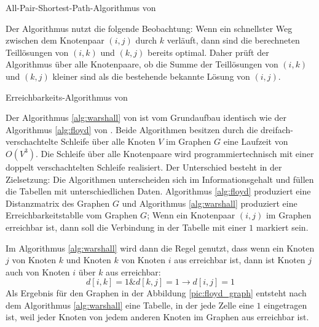 \documentclass[12pt]{article}
\begin{document}
\begin{algorithm}
\caption{All-Pair-Shortest-Path-Algorithmus von \cite{floyd1962}}
\label{alg:floyd}
\end{algorithm}

Der Algorithmus nutzt die folgende Beobachtung: Wenn ein schnellster Weg zwischen dem Knotenpaar $(i,j)$ durch $k$ verläuft, dann sind die berechneten Teillösungen von $(i,k)$ und $(k,j)$ bereits optimal. Daher prüft der Algorithmus über alle Knotenpaare, ob die Summe der Teillösungen von $(i,k)$ und $(k,j)$ kleiner sind als die bestehende bekannte Lösung von $(i,j)$.\\

\begin{algorithm}
\caption{Erreichbarkeits-Algorithmus von \cite{warshall1962}}
\label{alg:warshall}
\end{algorithm}

\pagebreak
Der Algorithmus \ref{alg:warshall} von \cite{warshall1962} ist vom Grundaufbau identisch wie der Algorithmus \ref{alg:floyd} von \cite{floyd1962}. Beide Algorithmen besitzen durch die dreifach-verschachtelte Schleife über alle Knoten $V$ im Graphen $G$ eine Laufzeit von $O(V^3)$. Die Schleife über alle Knotenpaare wird programmiertechnisch mit einer doppelt verschachtelten Schleife realisiert. Der Unterschied besteht in der Zielsetzung: Die Algorithmen unterscheiden sich im Informationsgehalt und füllen die Tabellen mit unterschiedlichen Daten. Algorithmus \ref{alg:floyd} produziert eine Distanzmatrix des Graphen $G$ und Algorithmus \ref{alg:warshall} produziert eine Erreichbarkeitstablle vom Graphen $G$; Wenn ein Knotenpaar $(i,j)$ im Graphen erreichbar ist, dann soll die Verbindung in der Tabelle mit einer $1$ markiert sein. 

Im Algorithmus \ref{alg:warshall} wird dann die Regel genutzt, dass wenn ein Knoten $j$ von Knoten $k$ und Knoten $k$ von Knoten $i$ aus erreichbar ist, dann ist Knoten $j$ auch von Knoten $i$ über $k$ aus erreichbar: 
\begin{equation}
	d[i,k] = 1 \& d[k,j] = 1 \rightarrow d[i,j] = 1
	\label{eq:erreichbarkeit}
\end{equation}
Als Ergebnis für den Graphen in der Abbildung \ref{pic:floyd_graph} entsteht nach dem Algorithmus \ref{alg:warshall} eine Tabelle, in der jede Zelle eine $1$ eingetragen ist, weil jeder Knoten von jedem anderen Knoten im Graphen aus erreichbar ist.
\end{document}
